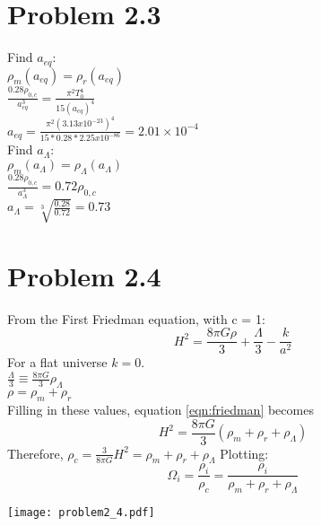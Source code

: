 \documentclass[11pt, oneside, doublespacing]{article}   	%
\begin{document}
\newpage
\section*{Problem 2.3}
\noindent Find $a_{eq}$: \\
$\rho_{m}(a_{eq}) = \rho_{r}(a_{eq})$ \\
$\frac{0.28 \rho_{0, c}}{a_{eq}^{3}} = \frac{\pi^{2} T_{0}^{4} }{15(a_{eq})^{4}}$ \\
$a_{eq} = \frac{\pi^{2} (3.13 x 10^{-23})^{4}}{15 * 0.28 * 2.25x10^{-86}} = 2.01\times10^{-4}$  \\


\noindent Find $a_{\Lambda}$:\\
$\rho_{m}(a_{\Lambda}) = \rho_{\Lambda}(a_{\Lambda})$ \\
$\frac{0.28 \rho_{0, c}}{a_{\Lambda}^{3}} = 0.72 \rho_{0, c} $ \\
$a_{\Lambda} = \sqrt[3]{\frac{0.28}{0.72}} = 0.73 $ \\


\section*{Problem 2.4}
\noindent From the First Friedman equation, with c = 1:
\begin{equation}
H^{2} = \frac{8\pi G \rho}{3} + \frac{\Lambda}{3} - \frac{k}{a^2}
\label{eqn:friedman}
\end{equation}
For a flat universe $k=0$. \\
$\frac{\Lambda}{3} \equiv \frac{8\pi G}{3}\rho_{\Lambda}$\\
$\rho = \rho_m + \rho_r $\\
Filling in these values, equation \ref{eqn:friedman} becomes
\begin{equation*}
H^{2} = \frac{8\pi G}{3} (\rho_m + \rho_r + \rho_{\Lambda})
\end{equation*}
Therefore, $\rho_{c} = \frac{3}{8\pi G}H^{2} = \rho_m + \rho_r + \rho_{\Lambda}$
Plotting:
\begin{equation}
\Omega_{i} = \frac{\rho_i}{\rho_c} = \frac{\rho_i}{\rho_m + \rho_r + \rho_{\Lambda}}
\end{equation}

\texttt{[image: problem2\_4.pdf]}
\end{document}
